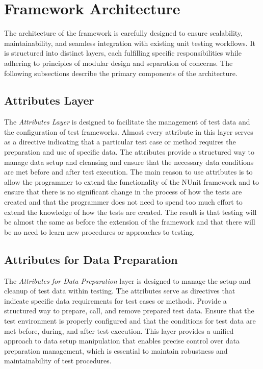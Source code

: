 
\section{Framework Architecture}

The architecture of the framework is carefully designed to ensure scalability,
maintainability, and seamless integration with existing unit testing workflows.
It is structured into distinct layers,
each fulfilling specific responsibilities while adhering to principles of modular design and separation of concerns. The following subsections describe the primary components of the architecture.


\subsection{Attributes Layer}

The \textit{Attributes Layer} is designed to facilitate the management of test data and the configuration of test frameworks. Almost every attribute in this layer serves as a directive indicating that a particular test case or method requires the preparation and use of specific data. The attributes provide a structured way to manage data setup and cleansing and ensure that the necessary  data conditions are met before and after test execution. The main reason to use attributes is to allow the programmer to extend the functionality of the NUnit framework and to ensure that there is no significant change in the process of how the tests are created and that the programmer does not need to spend too much effort to extend the knowledge of how the tests are created. The result is that testing will be almost the same as before the extension of the framework and that there will be no need to learn new procedures or approaches to testing.


\subsection*{Attributes for Data Preparation}

The \textit{Attributes for Data Preparation} layer is designed to manage the setup and cleanup of test data within testing. The attributes serve as directives that indicate specific data requirements for test cases or methods. Provide a structured way to prepare, call, and remove prepared test data.  Ensure that the test environment is properly configured and that the conditions for test data are met before, during, and after test execution. This layer provides a unified approach to data setup manipulation that enables precise control over data preparation management, which is essential to maintain robustness and maintainability of test procedures.

